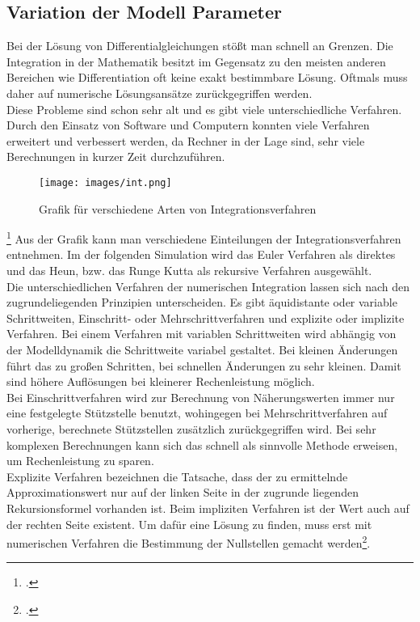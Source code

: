 \documentclass[12pt,a4paper]{scrartcl}	%
\begin{document}
\subsection{Variation der Modell Parameter}
Bei der Lösung von Differentialgleichungen stößt man schnell an Grenzen. Die Integration in der Mathematik besitzt im Gegensatz zu den meisten anderen Bereichen wie Differentiation oft keine exakt bestimmbare Lösung. Oftmals muss daher auf numerische Lösungsansätze zurückgegriffen werden.\\
Diese Probleme sind schon sehr alt und es gibt viele unterschiedliche Verfahren. Durch den Einsatz von Software und Computern konnten viele Verfahren erweitert und verbessert werden, da Rechner in der Lage sind, sehr viele Berechnungen in kurzer Zeit durchzuführen.
\begin{figure}[htb]
	\centering
	\texttt{[image: images/int.png]}
	\caption[Grafik für verschiedene Arten von Integrationsverfahren]{Grafik für verschiedene Arten von Integrationsverfahren\footnotemark}
\end{figure}
\footcitetext[vgl.][Abruf am 21.08.2018]{int}
Aus der Grafik kann man verschiedene Einteilungen der Integrationsverfahren entnehmen. Im der folgenden Simulation wird das Euler Verfahren als direktes und das Heun, bzw. das Runge Kutta als rekursive Verfahren ausgewählt.\\
Die unterschiedlichen Verfahren der numerischen Integration lassen sich nach den zugrundeliegenden Prinzipien unterscheiden. Es gibt äquidistante oder variable Schrittweiten, Einschritt- oder Mehrschrittverfahren und explizite oder implizite Verfahren. Bei einem Verfahren mit variablen Schrittweiten  wird abhängig von der Modelldynamik die Schrittweite variabel gestaltet. Bei kleinen Änderungen führt das zu großen Schritten, bei schnellen Änderungen zu sehr kleinen. Damit sind höhere Auflösungen bei kleinerer Rechenleistung möglich.\\
Bei Einschrittverfahren wird zur Berechnung von Näherungswerten immer nur eine festgelegte Stützstelle benutzt, wohingegen bei Mehrschrittverfahren auf vorherige, berechnete Stützstellen zusätzlich zurückgegriffen wird. Bei sehr komplexen Berechnungen kann sich das schnell als sinnvolle Methode erweisen, um Rechenleistung zu sparen.\\
Explizite Verfahren bezeichnen die Tatsache, dass der zu ermittelnde Approximationswert nur auf der linken Seite in der zugrunde liegenden Rekursionsformel vorhanden ist. Beim impliziten Verfahren ist der Wert auch auf der rechten Seite existent. Um dafür eine Lösung zu finden, muss erst mit numerischen Verfahren die Bestimmung der Nullstellen gemacht werden\footcite[vgl][S. 54]{simu}.
\end{document}
